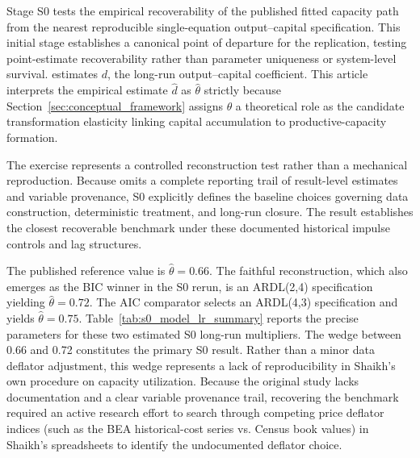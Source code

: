 \documentclass[11pt]{article}
\begin{document}
Stage S0 tests the empirical recoverability of the published fitted capacity path from the nearest reproducible single-equation output--capital specification. This initial stage establishes a canonical point of departure for the replication, testing point-estimate recoverability rather than parameter uniqueness or system-level survival. \citet{Shaikh2016} estimates $d$, the long-run output--capital coefficient. This article interprets the empirical estimate $\hat{d}$ as $\hat{\theta}$ strictly because Section~\ref{sec:conceptual_framework} assigns $\theta$ a theoretical role as the candidate transformation elasticity linking capital accumulation to productive-capacity formation.

The exercise represents a controlled reconstruction test rather than a mechanical reproduction. Because \citet{Shaikh2016} omits a complete reporting trail of result-level estimates and variable provenance, S0 explicitly defines the baseline choices governing data construction, deterministic treatment, and long-run closure. The result establishes the closest recoverable benchmark under these documented historical impulse controls and lag structures. 

The published reference value is $\hat{\theta}=0.66$. The faithful reconstruction, which also emerges as the BIC winner in the S0 rerun, is an ARDL(2,4) specification yielding $\hat{\theta}=0.72$. The AIC comparator selects an ARDL(4,3) specification and yields $\hat{\theta}=0.75$. Table~\ref{tab:s0_model_lr_summary} reports the precise parameters for these two estimated S0 long-run multipliers. The wedge between 0.66 and 0.72 constitutes the primary S0 result. Rather than a minor data deflator adjustment, this wedge represents a lack of reproducibility in Shaikh's own procedure on capacity utilization. Because the original study lacks documentation and a clear variable provenance trail, recovering the benchmark required an active research effort to search through competing price deflator indices (such as the BEA historical-cost series vs. Census book values) in Shaikh's spreadsheets to identify the undocumented deflator choice.
\end{document}
